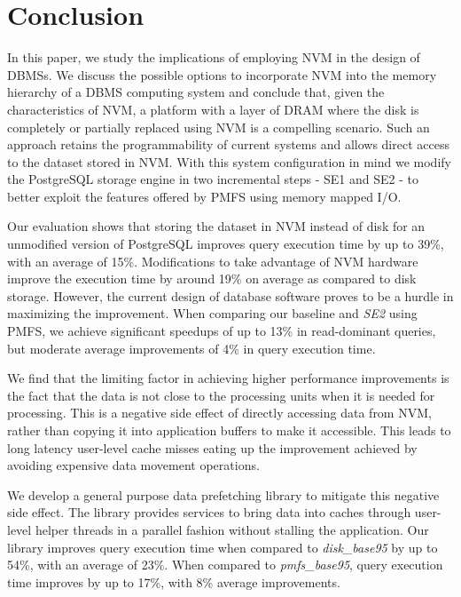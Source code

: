\section{Conclusion}
\label{sec:conclusion}
\noindent In this paper, we study the implications of employing NVM in the design of DBMSs. We discuss the possible options to incorporate NVM into the memory hierarchy of a DBMS computing system and conclude that, given the characteristics of NVM, a platform with a layer of DRAM where the disk is completely or partially replaced using NVM is a compelling scenario. Such an approach retains the programmability of current systems and allows direct access to the dataset stored in NVM. With this system configuration in mind we modify the PostgreSQL storage engine in two incremental steps - SE1 and SE2 - to better exploit the features offered by PMFS using memory mapped I/O.

Our evaluation shows that storing the dataset in NVM instead of disk for an unmodified version of PostgreSQL improves query execution time 
by up to 39\%, with an average of 15\%. Modifications to take advantage of NVM hardware improve the execution time by around 
19\% on average as compared to disk storage. However, the current design of database software proves to be a hurdle in maximizing the improvement. 
When comparing our baseline and \textit{SE2} using PMFS, we achieve significant speedups of up to 13\% in read-dominant queries, 
but moderate average improvements of 4\% in query execution time.

We find that the limiting factor in achieving higher performance improvements is the fact that the data is not close to the processing 
units when it is needed for processing. This is a negative side effect of directly accessing data from NVM, rather than copying it into 
application buffers to make it accessible. This leads to long latency user-level cache misses eating up the improvement achieved by avoiding 
expensive data movement operations. 

We develop a general purpose data prefetching library to mitigate this negative side effect. 
The library provides services to bring data into caches through user-level helper threads in a parallel fashion without stalling the application. 
Our library improves query execution time when compared to \emph{disk\_base95} by up to 54\%, with an average of 23\%. When compared to \emph{pmfs\_base95}, query execution time improves by up to 17\%, with 8\% average improvements.
%
